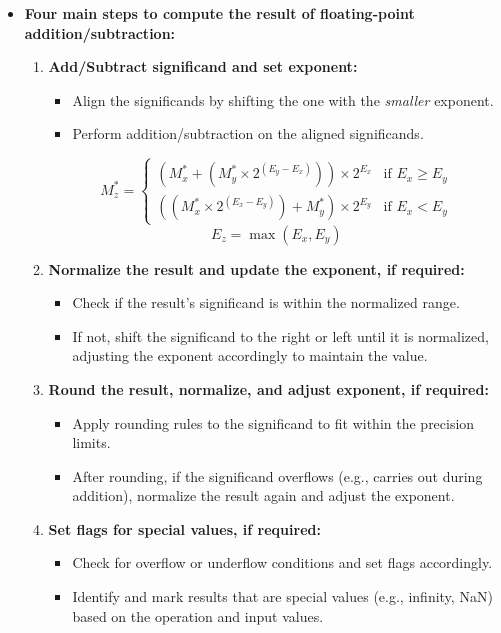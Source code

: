 \documentclass[12pt,openany, tikz,border=10pt]{book}
\begin{document}
    \newpage
    \begin{itemize}
        \item[] \textbf{Four main steps to compute the result of floating-point addition/subtraction:}
        \begin{enumerate}
            \item \textbf{Add/Subtract significand and set exponent:}
            \begin{itemize}
                \item Align the significands by shifting the one with the \textit{smaller} exponent.
                \item Perform addition/subtraction on the aligned significands.
            \end{itemize}
            \[
            M_z^* = 
            \begin{cases} 
                (M_x^* + (M_y^* \times 2^{(E_y - E_x)})) \times 2^{E_x} & \text{if } E_x \geq E_y \\
                ((M_x^* \times 2^{(E_x - E_y)}) + M_y^*) \times 2^{E_y} & \text{if } E_x < E_y
            \end{cases}
            \]
            \[
            E_z = \max(E_x, E_y)
            \]
      
            \item \textbf{Normalize the result and update the exponent, if required:}
            \begin{itemize}
                \item Check if the result's significand is within the normalized range.
                \item If not, shift the significand to the right or left until it is normalized, adjusting the exponent accordingly to maintain the value.
            \end{itemize}
    
            \item \textbf{Round the result, normalize, and adjust exponent, if required:}
            \begin{itemize}
                \item Apply rounding rules to the significand to fit within the precision limits.
                \item After rounding, if the significand overflows (e.g., carries out during addition), normalize the result again and adjust the exponent.
            \end{itemize}
    
            \item \textbf{Set flags for special values, if required:}
            \begin{itemize}
                \item Check for overflow or underflow conditions and set flags accordingly.
                \item Identify and mark results that are special values (e.g., infinity, NaN) based on the operation and input values.
            \end{itemize}
        \end{enumerate}
    \end{itemize}
    
\end{document}
